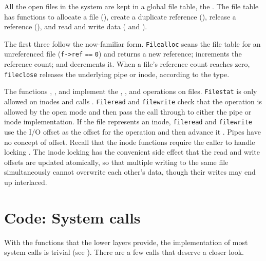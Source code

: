 All the open files in the system are kept in a global file table,
the 
.
The file table
has functions to allocate a file
(),
create a duplicate reference
(),
release a reference
(),
and read and write data
(
and 
).

The first three follow the now-familiar form.
\lstinline{Filealloc}
scans the file table for an unreferenced file
(\lstinline{f->ref}
\lstinline{==}
\lstinline{0})
and returns a new reference;
increments the reference count;
and
decrements it.
When a file's reference count reaches zero,
\lstinline{fileclose}
releases the underlying pipe or inode,
according to the type.

The functions
,
,
and
implement the 
,
,
and
operations on files.
\lstinline{Filestat}
is only allowed on inodes and calls
.
\lstinline{Fileread}
and
\lstinline{filewrite}
check that the operation is allowed by
the open mode and then
pass the call through to either
the pipe or inode implementation.
If the file represents an inode,
\lstinline{fileread}
and
\lstinline{filewrite}
use the I/O offset as the offset for the operation
and then advance it
.
Pipes have no concept of offset.
Recall that the inode functions require the caller
to handle locking
.
The inode locking has the convenient side effect that the
read and write offsets are updated atomically, so that
multiple writing to the same file simultaneously
cannot overwrite each other's data, though their writes may end up interlaced.
\section{Code: System calls}

With the functions that the lower layers provide, the implementation of most
system calls is trivial
(see
).
There are a few calls that
deserve a closer look.

